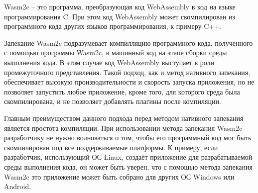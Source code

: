 Wasm2c -- это программа, преобразующая код WebAssembly в код на языке программирования C.
При этом код WebAssembly может скомпилирован из программного кода других языков программирования, к примеру C++.

Запекание Wasm2c подразумевает компилляцию программного кода, полученного с помощью программы Wasm2c, в машинный код на этапе сборки среды выполнения кода.
В этом случае код WebAssembly выступает в роли промежуточного представления.
Такой подход, как и метод нативного запекания, обеспечивает высокую производительности и скорость запуска приложения, но не позволяет запустить любое приложение, кроме того, для которого среда была скомпилирована, и не позволяет добавлять плагины после компиляции.

Главным преимуществом данного подхода перед методом нативного запекания является простота компиляции.
При использовании метода запекания Wasm2c разработчику не нужно волноваться о том, чтобы его программный код мог быть скомпилирован под все поддерживаемые платформы.
К примеру, если разработчик, использующий ОС Linux, создаёт приложение для разрабатываемой среды выполнения кода, он может быть уверен, что с помощью метода запекания Wasm2c это приложение может быть собрано для других ОС Windows или Android.
